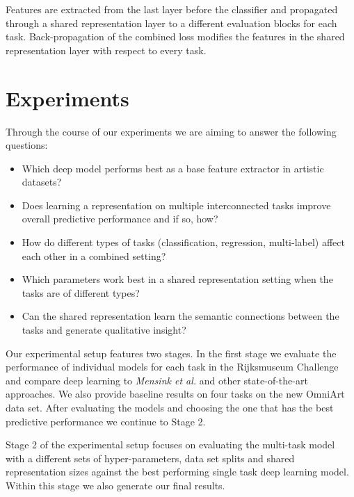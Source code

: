 \documentclass[sigconf]{acmart}
\begin{document}
Features are extracted from the last layer before the classifier and propagated through a shared representation layer to a different evaluation blocks for each task. Back-propagation of the combined loss modifies the features in the shared representation layer with respect to every task. 

\section{Experiments}

Through the course of our experiments we are aiming to answer the following questions:

\begin{itemize}
  \item Which deep model performs best as a base feature extractor in artistic datasets?
  \item Does learning a representation on multiple interconnected tasks improve overall predictive performance and if so, how?
  \item How do different types of tasks (classification, regression, multi-label) affect each other in a combined setting?
  \item Which parameters work best in a shared representation setting when the tasks are of different types?
  \item Can the shared representation learn the semantic connections between the tasks and generate qualitative insight?
\end{itemize}Our experimental setup features two stages. In the first stage we evaluate the performance of individual models for each task in the Rijksmuseum Challenge and compare deep learning to \textit{Mensink et al.}\cite{mensink2014rijksmuseum} and other state-of-the-art approaches. We also provide baseline results on four tasks on the new OmniArt data set. After evaluating the models and choosing the one that has the best predictive performance we continue to Stage 2. 

Stage 2 of the experimental setup focuses on evaluating the multi-task model with a different sets of hyper-parameters, data set splits and shared representation sizes against the best performing single task deep learning model. Within this stage we also generate our final results.
\end{document}
